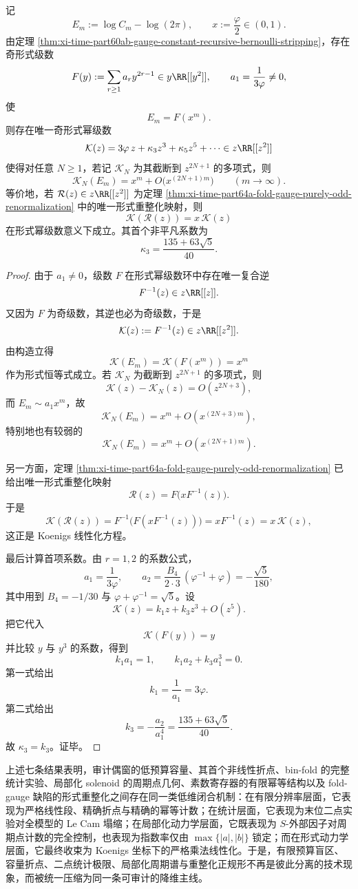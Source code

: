 \begin{theorem}\label{thm:xi-time-part69-fold-gauge-formal-koenigs-linearization}
记
\[
E_m:=\log C_m-\log(2\pi),
\qquad
x:=\frac{\varphi}{2}\in(0,1).
\]
由定理 \ref{thm:xi-time-part60ab-gauge-constant-recursive-bernoulli-stripping}，存在奇形式级数
\[
F(y):=\sum_{r\ge 1}a_r y^{2r-1}\in y\RR[[y^2]],
\qquad
a_1=\frac{1}{3\varphi}\neq 0,
\]
使
\[
E_m=F(x^m).
\]
则存在唯一奇形式幂级数
\[
\mathcal K(z)=3\varphi\,z+\kappa_3 z^3+\kappa_5 z^5+\cdots \in z\RR[[z^2]]
\]
使得对任意 \(N\ge 1\)，若记 \(\mathcal K_N\) 为其截断到 \(z^{2N+1}\) 的多项式，则
\[
\mathcal K_N(E_m)=x^m+O\!\bigl(x^{(2N+1)m}\bigr)
\qquad (m\to\infty).
\]
等价地，若 \(\mathcal R(z)\in z\RR[[z^2]]\) 为定理 \ref{thm:xi-time-part64a-fold-gauge-purely-odd-renormalization} 中的唯一形式重整化映射，则
\[
\mathcal K(\mathcal R(z))=x\,\mathcal K(z)
\]
在形式幂级数意义下成立。其首个非平凡系数为
\[
\kappa_3=\frac{135+63\sqrt5}{40}.
\]
\end{theorem}
\begin{proof}
由于 \(a_1\neq 0\)，级数 \(F\) 在形式幂级数环中存在唯一复合逆
\[
F^{-1}(z)\in z\RR[[z]].
\]
又因为 \(F\) 为奇级数，其逆也必为奇级数，于是
\[
\mathcal K(z):=F^{-1}(z)\in z\RR[[z^2]].
\]
由构造立得
\[
\mathcal K(E_m)=\mathcal K(F(x^m))=x^m
\]
作为形式恒等式成立。若 \(\mathcal K_N\) 为截断到 \(z^{2N+1}\) 的多项式，则
\[
\mathcal K(z)-\mathcal K_N(z)=O(z^{2N+3}),
\]
而 \(E_m\sim a_1x^m\)，故
\[
\mathcal K_N(E_m)=x^m+O(x^{(2N+3)m}),
\]
特别地也有较弱的
\[
\mathcal K_N(E_m)=x^m+O(x^{(2N+1)m}).
\]

另一方面，定理 \ref{thm:xi-time-part64a-fold-gauge-purely-odd-renormalization} 已给出唯一形式重整化映射
\[
\mathcal R(z)=F\!\bigl(xF^{-1}(z)\bigr).
\]
于是
\[
\mathcal K(\mathcal R(z))
=
F^{-1}\!\bigl(F(xF^{-1}(z))\bigr)
=
xF^{-1}(z)
=
x\,\mathcal K(z),
\]
这正是 Koenigs 线性化方程。

最后计算首项系数。由 \(r=1,2\) 的系数公式，
\[
a_1=\frac{1}{3\varphi},
\qquad
a_2=\frac{B_4}{2\cdot 3}\,(\varphi^{-1}+\varphi)
=
-\frac{\sqrt5}{180},
\]
其中用到 \(B_4=-1/30\) 与 \(\varphi+\varphi^{-1}=\sqrt5\)。设
\[
\mathcal K(z)=k_1 z+k_3 z^3+O(z^5).
\]
把它代入
\[
\mathcal K(F(y))=y
\]
并比较 \(y\) 与 \(y^3\) 的系数，得到
\[
k_1a_1=1,
\qquad
k_1a_2+k_3a_1^3=0.
\]
第一式给出
\[
k_1=\frac{1}{a_1}=3\varphi.
\]
第二式给出
\[
k_3=-\frac{a_2}{a_1^4}
=
\frac{135+63\sqrt5}{40}.
\]
故 \(\kappa_3=k_3\)。证毕。
\end{proof}

\noindent
上述七条结果表明，审计偶窗的低预算容量、其首个非线性折点、bin-fold 的完整统计实验、局部化 solenoid 的周期点几何、素数寄存器的有限幂等结构以及 fold-gauge 缺陷的形式重整化之间存在同一类低维闭合机制：在有限分辨率层面，它表现为严格线性段、精确折点与精确的幂等计数；在统计层面，它表现为末位二点实验对全模型的 Le Cam 塌缩；在局部化动力学层面，它既表现为 \(S\)-外部因子对周期点计数的完全控制，也表现为指数率仅由 \(\max\{|a|,|b|\}\) 锁定；而在形式动力学层面，它最终收束为 Koenigs 坐标下的严格乘法线性化。于是，有限预算盲区、容量折点、二点统计极限、局部化周期谱与重整化正规形不再是彼此分离的技术现象，而被统一压缩为同一条可审计的降维主线。



\endinput
